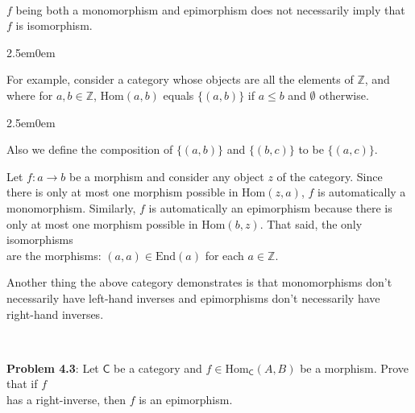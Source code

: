 \documentclass{book}
\newcommand{\pracOne}{
   \color{BrickRed}%
   \fontsize{13}{15}\selectfont%
}
\newcommand{\exOne}{%
   \color{Purple}%
   \fontsize{14}{16}\selectfont%
}
\newcommand{\exTwo}{%
   \color{RedViolet}%
   \fontsize{13}{15}\selectfont%
}
\newcommand{\exP}{%
   \color{VioletRed}%
   \fontsize{12}{14}\selectfont%
}
\newenvironment{myIndent}{%
   \begin{adjustwidth}{2.5em}{0em}%
}{%
   \end{adjustwidth}%
}
\newcommand{\myHom}{\mathrm{Hom}}
\newcommand{\myEnd}{\mathrm{End}}
\newcommand{\mcateg}[1]{\mathsf{#1}}
\newcommand{\mySepTwo}[1][.]{%
   {\noindent\color{#1}{\rule{6.5in}{0.5mm}}}\\%
}
\newcommand{\retTwo}{\hfill\bigbreak}
\begin{document}
\exOne\mySepTwo

$f$ being both a monomorphism and epimorphism does not necessarily imply that\\ $f$ is isomorphism.
{\begin{myIndent} \exTwo
   For example, consider a category whose objects are all the elements of $\mathbb{Z}$, and\\ where for $a, b \in \mathbb{Z}$, $\myHom(a, b)$ equals $\{(a, b)\}$ if $a \leq b$ and $\emptyset$ otherwise.
   {\begin{myIndent}\exP
      Also we define the composition of $\{(a, b)\}$ and $\{(b, c)\}$ to be $\{(a, c)\}$.
   \end{myIndent}}

   \newpage

   Let $f: a \longrightarrow b$ be a morphism and consider any object $z$ of the category. Since\\ there is only at most one morphism possible in $\myHom(z, a)$, $f$ is automatically a\\ monomorphism. Similarly, $f$ is automatically an epimorphism because there is\\ only at most one morphism possible in $\myHom(b, z)$. That said, the only isomorphisms\\ are the morphisms: $(a, a) \in \myEnd(a)$ for each $a \in \mathbb{Z}$.\retTwo
\end{myIndent}}

Another thing the above category demonstrates is that monomorphisms don't\\ necessarily have left-hand inverses and epimorphisms don't necessarily have\\ right-hand inverses.

\mySepTwo

\pracOne
\textbf{Problem 4.3}: Let $\mcateg{C}$ be a category and $f \in \myHom_\mcateg{C}(A, B)$ be a morphism. Prove that if $f$\\ has a right-inverse, then $f$ is an epimorphism.\retTwo
\end{document}
